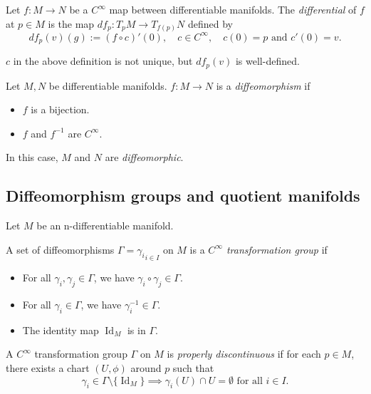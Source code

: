 \begin{definition}[Differential]
Let $f:M\to N$ be a $C^{\infty}$ map between differentiable manifolds. The \emph{differential} of $f$ at $p \in M$ is the map
$df_p: T_pM \to T_{f(p)}N$ defined by
\[df_p(v)(g) := (f\circ c)'(0), \quad c \in C^{\infty}, \quad c(0) = p \text{ and } c'(0) = v. \]
\end{definition}

\begin{remark}
$c$ in the above definition is not unique, but $df_p(v)$ is well-defined.
\end{remark}

\begin{definition}[Diffeomorphism]
Let $M,N$ be differentiable manifolds. $f:M\to N$ is a \emph{diffeomorphism} if
\begin{itemize}
\item $f$ is a bijection.
\item $f$ and $f^{-1}$ are $C^{\infty}$.
\end{itemize}
In this case, $M$ and $N$ are \emph{diffeomorphic}.
\end{definition}

\subsection{Diffeomorphism groups and quotient manifolds}

Let $M$ be an n-differentiable manifold.

\begin{definition}
A set of diffeomorphisms $\Gamma = {\gamma_i}_{i\in I}$ on $M$ is a \emph{$C^{\infty}$ transformation group} if
\begin{itemize}
    \item For all $\gamma_i, \gamma_j \in \Gamma$, we have $\gamma_i \circ \gamma_j \in \Gamma$.
    \item For all $\gamma_i \in \Gamma$, we have $\gamma_i^{-1} \in \Gamma$.
    \item The identity map $\operatorname{Id}_M$ is in $\Gamma$.
\end{itemize}
\end{definition}

\begin{definition}
A $C^{\infty}$ transformation group $\Gamma$ on $M$ is \emph{properly discontinuous} if for each $p \in M$, there exists a chart $(U, \phi)$ around $p$ such that 
\[\gamma_i \in \Gamma \setminus \{\operatorname{Id}_M\} \implies \gamma_i(U) \cap U = \emptyset \text{ for all } i \in I.\]
\label{def:properly_disc_transf_group}
\end{definition}

